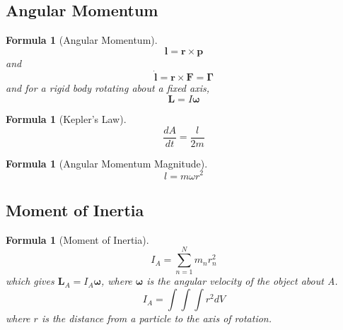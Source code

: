 \documentclass[12pt]{article}
\newtheorem{for}[thm]{Formula}
\theoremstyle{definition}
\theoremstyle{remark}
\numberwithin{equation}{section}
\newcommand\B[1]{\textbf{#1}}
\begin{document}
\vspace{15pt}

\subsection{Angular Momentum}


\begin{for}[Angular Momentum]
        \begin{equation}
                \B{l} = \B{r} \times \B{p}
        \end{equation}
        and \begin{equation}
                \dot{\B{l}} = \B{r} \times \B{F} = \boldsymbol{\Gamma}
        \end{equation}
        and for a rigid body rotating about a fixed axis, \begin{equation}
                \B{L} = I\boldsymbol{\omega}
        \end{equation}
\end{for}



\vspace{15pt}

\begin{for}[Kepler's Law]
         \begin{equation}
                \frac{dA}{dt} = \frac{l}{2m}
        \end{equation}
\end{for}


\vspace{15pt}

\begin{for}[Angular Momentum Magnitude]
        \begin{equation}
                l = m\omega r^2
        \end{equation}
\end{for}

\vspace{15pt}


\subsection{Moment of Inertia}


\begin{for}[Moment of Inertia]
        \begin{equation}
                I_A = \sum\limits_{n=1}^Nm_nr_n^2
        \end{equation}
        which gives $\B{L}_A = I_A\boldsymbol{\omega}$, where $\boldsymbol{\omega}$ is the angular velocity of the object about A.\begin{equation}
                I_A = \int\int\int r^2 dV
        \end{equation}
        where $r$ is the distance from a particle to the axis of rotation.
\end{for}
\end{document}
